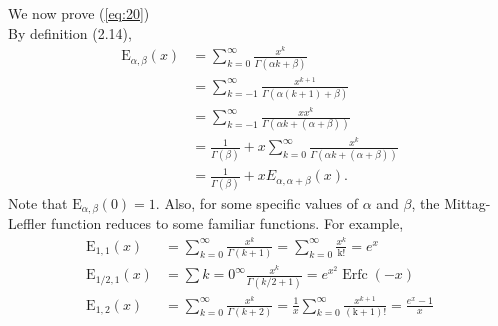 \documentclass[a4paper,14pt,oneside]{book}
\theoremstyle{plain}
\theoremstyle{definition}
\theoremstyle{remark}
\begin{document}
{We now prove (\ref{eq:20})\\
By definition (2.14), 
$$
\begin{aligned} 
\mathrm{E}_{\alpha, \beta}(x)&=\sum_{k=0}^{\infty} \frac{x^{k}}{\Gamma(\alpha k+\beta)}\\
&=\sum_{k=-1}^{\infty} \frac{x^{k+1}}{\Gamma(\alpha(k+1)+\beta)} \\
&=\sum_{k=-1}^{\infty} \frac{x x^{k}}{\Gamma(\alpha k+(\alpha+\beta))} \\
&=\frac{1}{\Gamma(\beta)}+x \sum_{k=0}^{\infty} \frac{x^{k}}{\Gamma(\alpha k+(\alpha+\beta))} \\
&=\frac{1}{\Gamma(\beta)}+x E_{\alpha, \alpha+\beta}(x).
\end{aligned}
$$
Note that $\mathrm{E}_{\alpha, \beta}(0)=1$. Also, for some specific values of $\alpha$ and $\beta$, the Mittag-Leffler function reduces to some familiar functions. For example,
\begin{align}
\mathrm{E}_{1,1}(x)&=\sum_{k=0}^{\infty} \frac{x^{k}}{\Gamma(k+1)}=\sum_{k=0}^{\infty} \frac{x^{k}}{\mathrm{k!}}=e^{x}\\
\mathrm{E}_{1/2,1}(x)&=\sum{k=0}^{\infty} \frac{x^{k}}{\Gamma(k / 2+1)}=e^{x^{2}} \operatorname{Erfc}(-x)\\
\mathrm{E}_{1,2}(x)&=\sum_{k=0}^{\infty} \frac{x^{k}}{\Gamma(k+2)}=\frac{1}{x} \sum_{k=0}^{\infty} \frac{x^{k+1}}{(\mathrm{k}+1) !}=\frac{e^{x}-1}{x}
\end{align}}
\end{document}
